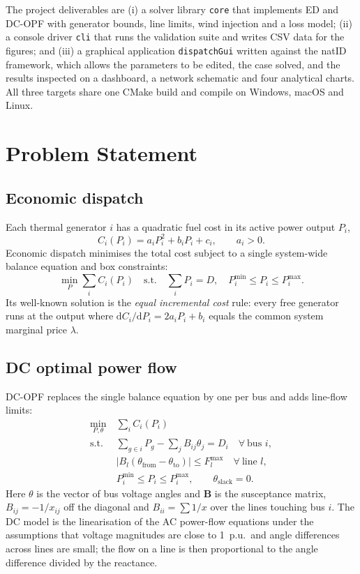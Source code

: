 \documentclass[conference]{IEEEtran}
\begin{document}
The project deliverables are (i) a solver library \texttt{core} that implements ED and DC-OPF with generator bounds, line limits, wind injection and a loss model; (ii) a console driver \texttt{cli} that runs the validation suite and writes CSV data for the figures; and (iii) a graphical application \texttt{dispatchGui} written against the natID framework, which allows the parameters to be edited, the case solved, and the results inspected on a dashboard, a network schematic and four analytical charts. All three targets share one CMake build and compile on Windows, macOS and Linux.

\section{Problem Statement}
\subsection{Economic dispatch}
Each thermal generator $i$ has a quadratic fuel cost in its active power output $P_i$,
\begin{equation}
  C_i(P_i) = a_i P_i^2 + b_i P_i + c_i,\qquad a_i > 0 .
\end{equation}
Economic dispatch minimises the total cost subject to a single system-wide balance equation and box constraints:
\begin{equation}
  \min_P \sum_i C_i(P_i)\quad\text{s.t.}\quad \sum_i P_i = D,\quad P_i^{\min}\le P_i \le P_i^{\max}.
  \label{eq:ed}
\end{equation}
Its well-known solution is the \emph{equal incremental cost} rule: every free generator runs at the output where $\mathrm{d}C_i/\mathrm{d}P_i = 2a_iP_i+b_i$ equals the common system marginal price $\lambda$.

\subsection{DC optimal power flow}
DC-OPF replaces the single balance equation by one per bus and adds line-flow limits:
\begin{align}
  \min_{P,\theta}\ &\sum_i C_i(P_i) \label{eq:opf}\\
  \text{s.t.}\ & \sum_{g\in i} P_g - \sum_j B_{ij}\theta_j = D_i \quad \forall\ \text{bus } i, \nonumber\\
  & |B_l(\theta_{\mathrm{from}}-\theta_{\mathrm{to}})| \le F_l^{\max} \quad \forall\ \text{line } l, \nonumber\\
  & P_i^{\min}\le P_i\le P_i^{\max},\qquad \theta_{\mathrm{slack}} = 0. \nonumber
\end{align}
Here $\theta$ is the vector of bus voltage angles and $\mathbf{B}$ is the susceptance matrix, $B_{ij}=-1/x_{ij}$ off the diagonal and $B_{ii}=\sum 1/x$ over the lines touching bus $i$. The DC model is the linearisation of the AC power-flow equations under the assumptions that voltage magnitudes are close to 1~p.u.\ and angle differences across lines are small; the flow on a line is then proportional to the angle difference divided by the reactance.
\end{document}
